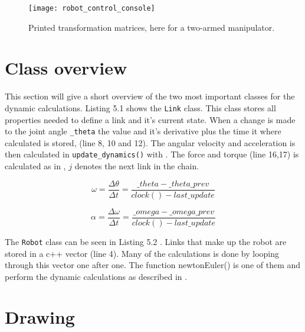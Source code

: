 \begin{figure}[h!]
    \centering
    \texttt{[image: robot\_control\_console]}
    \caption{Printed transformation matrices, here for a two-armed manipulator.}
    \label{console}
\end{figure}

\clearpage

\section{Class overview}

This section will give a short overview of the two most important classes for the dynamic calculations. Listing 5.1  shows the \texttt{Link} class. This class stores all properties needed to define a link and it's current state. When a change is made to the joint angle \texttt{\_theta} the value and it's derivative plus the time it where calculated is stored, (line 8, 10 and 12). The angular velocity and acceleration is then calculated in \texttt{update\_dynamics()} with . The force and torque (line 16,17) is calculated as in , $j$ denotes the next link in the chain.


\label{Link}

\begin{equation}\label{omega_calc}
\omega = \frac{\Delta \theta}{\Delta t}=\frac{\_theta-\_theta\_prev}{clock()-last\_update}
\end{equation}

\begin{equation}\label{alpha_calc}
\alpha = \frac{\Delta \omega}{\Delta t}=\frac{\_omega-\_omega\_prev}{clock()-last\_update}
\end{equation}

\label{Robot}

The \texttt{Robot} class can be seen in Listing 5.2 . Links that make up the robot are stored in a c++ vector (line 4). Many of the calculations is done by looping through this vector one after one. The function \textsf{newtonEuler()} is one of them and perform the dynamic calculations as described in .


\section{Drawing}

